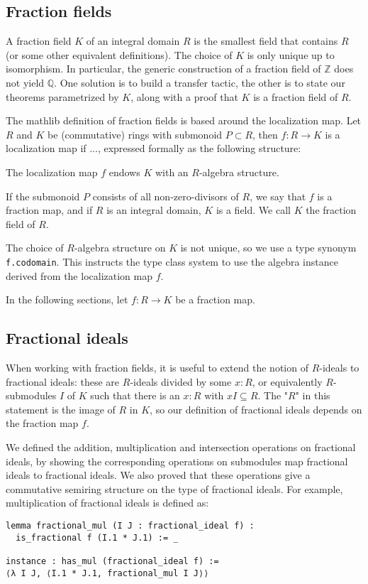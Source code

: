 \documentclass{lipics-v2021}
\newcommand{\lean}[1]{\texttt{#1}\xspace} %
\newcommand{\Q}{\mathbb{Q}}
\newcommand{\Z}{\mathbb{Z}}
\begin{document}
\subsection{Fraction fields}

A fraction field $K$ of an integral domain $R$ is the smallest field that contains $R$ (or some other equivalent definitions).
The choice of $K$ is only unique up to isomorphism.
In particular, the generic construction of a fraction field of $\Z$ does not yield $\Q$.
One solution is to build a transfer tactic, the other is to state our theorems parametrized by $K$, along with a proof that $K$ is a fraction field of $R$.

The mathlib definition of fraction fields is based around the localization map. Let $R$ and $K$ be (commutative) rings with submonoid $P \subset R$, then $f : R \to K$ is a localization map if ..., expressed formally as the following structure:

The localization map $f$ endows $K$ with an $R$-algebra structure.

If the submonoid $P$ consists of all non-zero-divisors of $R$, we say that $f$ is a fraction map, and if $R$ is an integral domain, $K$ is a field. We call $K$ the fraction field of $R$.

The choice of $R$-algebra structure on $K$ is not unique, so we use a type synonym \lean{f.codomain}. This instructs the type class system to use the algebra instance derived from the localization map $f$.

In the following sections, let $f : R \to K$ be a fraction map.

\subsection{Fractional ideals}

When working with fraction fields, it is useful to extend the notion of $R$-ideals to fractional ideals: these are $R$-ideals divided by some $x : R$, or equivalently $R$-submodules $I$ of $K$ such that there is an $x : R$ with $x I \subseteq R$. The "$R$" in this statement is the image of $R$ in $K$, so our definition of fractional ideals depends on the fraction map $f$.

We defined the addition, multiplication and intersection operations on fractional ideals,
by showing the corresponding operations on submodules map fractional ideals to fractional ideals.
We also proved that these operations give a commutative semiring structure on the type of fractional ideals.
For example, multiplication of fractional ideals is defined as:
\begin{lstlisting}
lemma fractional_mul (I J : fractional_ideal f) :
  is_fractional f (I.1 * J.1) := _

instance : has_mul (fractional_ideal f) :=
⟨λ I J, ⟨I.1 * J.1, fractional_mul I J⟩⟩
\end{lstlisting}
\end{document}
